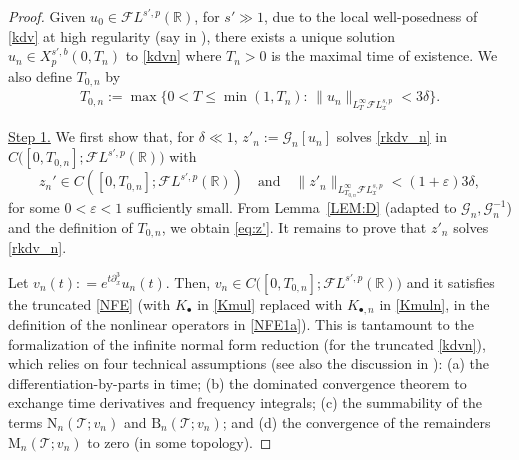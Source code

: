 \documentclass[a4paper,
11pt,  reqno]{amsart}
\newcommand{\5}{\textup{V}}
\newcommand{\noi}{\noindent}
\newcommand{\FL}{\mathcal{F} L}
\newcommand{\dl}{\delta}
\newcommand{\eps}{\varepsilon}
\newcommand{\dx}{\partial_x}
\theoremstyle{remark}
\newcommand{\R}{\mathbb{R}}
\newcommand{\bul}{\bullet}
\newcommand{\TT}{\mathcal{T}}
\newcommand{\Gc}{\mathcal{G}}
\numberwithin{equation}{section}
\numberwithin{theorem}{section}
\newcommand{\MM}{\mathrm{M}}
\newcommand{\NN}{\mathrm{N}}
\newcommand{\BB}{\mathrm{B}}
\begin{document}
\begin{proof}

Given $u_0 \in \FL^{s',p}(\R)$, for $s'\gg1$, due to the local well-posedness of \eqref{kdv} at high regularity (say in \cite{Grunrock_ldv_hier}), there exists a unique solution $u_n \in X^{s',b}_p(0,T_n)$ to \eqref{kdvn} where $T_n>0$ is the maximal time of existence. We also define $T_{0,n}$ by
\begin{align}
T_{0,n} :=
\max \big\{
0 < T \le \min(1, T_n) : \, \| u_n\|_{L^\infty_T \FL^{s,p}_x} < 3 \dl
\big\}.
\end{align}


\noi
\underline{Step 1.} We first show that, for $\delta\ll 1$, $z'_n := \Gc_n[u_n]$ solves \eqref{rkdv_n} in $C\big([0,T_{0,n}] ; \FL^{s',p}(\R)\big)$ with
\begin{equation}
	z_n'\in C([0,T_{0,n}];\FL^{s',p}(\R))
\quad
\text{and}
\quad
\|z'_n\|_{L^\infty_{T_{0,n}} \FL^{s,p}_x} < (1+\eps) 3 \delta,
\label{eq:z'}
\end{equation}
for some $0<\eps<1$ sufficiently small.
From Lemma~\ref{LEM:D} (adapted to $\Gc_n, \Gc_n^{-1}$) and the definition of $T_{0,n}$, we obtain \eqref{eq:z'}.
It remains to prove that $z'_n$ solves \eqref{rkdv_n}.

Let $v_n(t) : = e^{t\dx^3} u_n(t)$.
Then, $v_n \in C \big( [0,T_{0,n}] ; \FL^{s',p}(\R) \big)$ and it satisfies the truncated \eqref{NFE} (with $K_\bul$ in \eqref{Kmul} replaced with $K_{\bul, n}$ in \eqref{Kmuln}, in the definition of the nonlinear operators in \eqref{NFE1a}).
This is tantamount to the formalization of the infinite normal form reduction (for the truncated \eqref{kdvn}), which relies on four technical assumptions (see also the discussion in \cite[Section 4]{KOY20}): (a) the differentiation-by-parts in time; (b) the dominated convergence theorem to exchange time derivatives and frequency integrals; (c) the summability of the terms $\NN_n(\TT;v_n)$ and $\BB_n(\TT;v_n)$; and (d) the convergence of the remainders $\MM_n(\TT;v_n)$ to zero (in some topology).


\end{proof}
\end{document}
